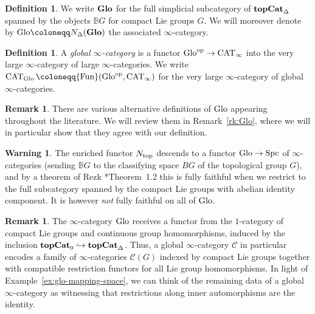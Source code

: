 \documentclass[reqno]{memo-l}
\theoremstyle{mythm}
\theoremstyle{definition}
\newtheorem{rk}[thm]{Remark}
\newtheorem{warn}[thm]{Warning}
\newtheorem{definition}[thm]{Definition}
\numberwithin{equation}{section}
\newcommand{\Cc}{{\mathcal{C}}}
\DeclareMathOperator{\Spc}{Spc}
\DeclareMathOperator{\CAT}{CAT}
\newcommand{\Fun}{{\textup{Fun}}}
\newcommand{\Ntop}{{N_\textup{top}}}
\newcommand{\cat}[1]{\textbf{\textup{#1}}}
\newcommand{\op}{{\textup{op}}}
\newcommand{\Glo}{\textup{Glo}}
\newcommand{\BGcat}[1]{\mathbb B{#1}}
\begin{document}
\begin{definition}\label{def:Glo}
    We write $\cat{Glo}$ for the full simplicial subcategory of $\cat{topCat}_\Delta$ spanned by the objects $\BGcat{G}$ for compact Lie groups $G$. We will moreover denote by $\Glo\coloneqq N_\Delta(\cat{Glo})$ the associated $\infty$-category.
\end{definition}

\begin{definition}\label{def:gl-infty-cat}
    A \emph{global $\infty$-category} is a functor $\Glo^\op\to\CAT_\infty$ into the very large $\infty$-category of large $\infty$-categories. We write $\CAT_\Glo\coloneqq\Fun(\Glo^\op,\CAT_\infty)$ for the very large $\infty$-category of global $\infty$-categories.
\end{definition}

\begin{rk}
    There are various alternative definitions of $\Glo$ appearing throughout the literature. We will review them in Remark~\ref{rk:Glo}, where we will in particular show that they agree with our definition.
\end{rk}

\begin{warn}
    The enriched functor $\Ntop$ descends to a functor $\Glo\to\Spc$ of $\infty$-categories (sending $\BGcat{G}$ to the classifying space $BG$ of the topological group $G$), and by a theorem of Rezk \cite{rezk-classifying}*{Theorem~1.2} this is fully faithful when we restrict to the full subcategory spanned by the compact Lie groups with abelian identity component. It is however \emph{not} fully faithful on all of $\Glo$.
\end{warn}

\begin{rk}
    The $\infty$-category $\Glo$ receives a functor from the $1$-category of compact Lie groups and continuous group homomorphisms, induced by the inclusion $\cat{topCat}_0\hookrightarrow\cat{topCat}_\Delta$. Thus, a global $\infty$-category $\Cc$ in particular encodes a family of $\infty$-categories $\Cc(G)$ indexed by compact Lie groups together with compatible restriction functors for all Lie group homomorphisms. In light of Example~\ref{ex:glo-mapping-space}, we can think of the remaining data of a global $\infty$-category as witnessing that restrictions along inner automorphisms are the identity.
\end{rk}
\end{document}
